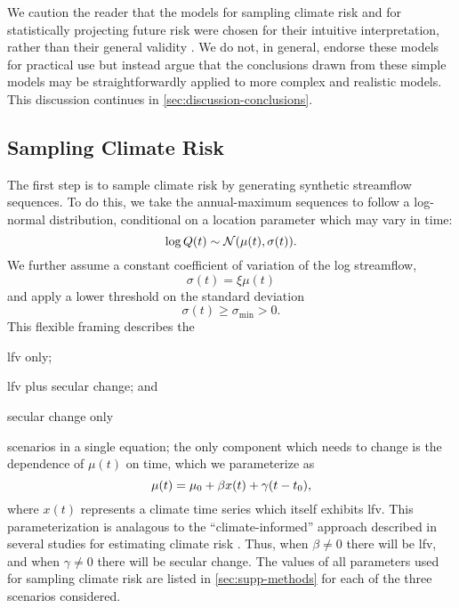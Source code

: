 \documentclass[
]{agujournal2018}
\newcommand{\normal}{\mathcal{N}}
\begin{document}
We caution the reader that the models for sampling climate risk and for statistically projecting future risk were chosen for their intuitive interpretation, rather than their general validity \citep[see][for a thoughtful discussion of the value of simple models]{Held:2005cj}.
We do not, in general, endorse these models for practical use but instead argue that the conclusions drawn from these simple models may be straightforwardly applied to more complex and realistic models.
This discussion continues in \cref{sec:discussion-conclusions}.

\subsection{Sampling Climate Risk}\label{sec:methods-generating}

The first step is to sample climate risk by generating synthetic streamflow sequences.
To do this, we take the annual-maximum sequences to follow a log-normal distribution, conditional on a location parameter which may vary in time:
\begin{equation} \label{eq:log-normal}
  \log Q(t) \sim \normal \qty(\mu(t), \sigma(t)).
\end{equation}
We further assume a constant coefficient of variation of the log streamflow,
\begin{equation}
  \sigma(t) = \xi \mu(t)  
\end{equation}
and apply a lower threshold on the standard deviation
\begin{equation}
  \sigma(t) \geq \sigma_\text{min} > 0.
\end{equation}
This flexible framing describes the \begin{enumerate*}[label= (\roman*)]
  \item \gls{lfv} only;
  \item \gls{lfv} plus secular change; and
  \item secular change only
\end{enumerate*}
scenarios in a single equation; the only component which needs to change is the dependence of $\mu(t)$ on time, which we parameterize as
\begin{equation}\label{eq:nino3}
  \mu(t) = \mu_0 + \beta x(t) + \gamma \qty(t - t_0),
\end{equation}
where $x(t)$ represents a climate time series which itself exhibits \gls{lfv}.
This parameterization is analagous to the ``climate-informed'' approach described in several studies for estimating climate risk \citep{Delgado:2014ey,Merz:2014gf,Farnham:2018gs}.
Thus, when $\beta \neq 0$ there will be \gls{lfv}, and when $\gamma \neq 0$ there will be secular change.
The values of all parameters used for sampling climate risk are listed in \cref{sec:supp-methods} for each of the three scenarios considered.
\end{document}
